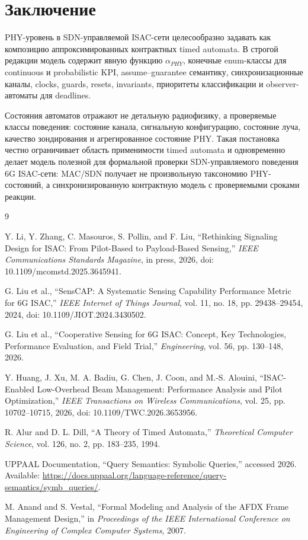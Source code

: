 \documentclass[10pt,a4paper]{article}
\begin{document}
\section{Заключение}

PHY-уровень в SDN-управляемой ISAC-сети целесообразно задавать как композицию аппроксимированных контрактных timed automata. В строгой редакции модель содержит явную функцию \(\alpha_{PHY}\), конечные enum-классы для continuous и probabilistic KPI, assume--guarantee семантику, синхронизационные каналы, clocks, guards, resets, invariants, приоритеты классификации и observer-автоматы для deadlines.

Состояния автоматов отражают не детальную радиофизику, а проверяемые классы поведения: состояние канала, сигнальную конфигурацию, состояние луча, качество зондирования и агрегированное состояние PHY. Такая постановка честно ограничивает область применимости timed automata и одновременно делает модель полезной для формальной проверки SDN-управляемого поведения 6G ISAC-сети: MAC/SDN получает не произвольную таксономию PHY-состояний, а синхронизированную контрактную модель с проверяемыми сроками реакции.

\begin{thebibliography}{9}

Y. Li, Y. Zhang, C. Masouros, S. Pollin, and F. Liu, ``Rethinking Signaling Design for ISAC: From Pilot-Based to Payload-Based Sensing,'' \emph{IEEE Communications Standards Magazine}, in press, 2026, doi: 10.1109/mcomstd.2025.3645941.

G. Liu et al., ``SensCAP: A Systematic Sensing Capability Performance Metric for 6G ISAC,'' \emph{IEEE Internet of Things Journal}, vol. 11, no. 18, pp. 29438--29454, 2024, doi: 10.1109/JIOT.2024.3430502.

G. Liu et al., ``Cooperative Sensing for 6G ISAC: Concept, Key Technologies, Performance Evaluation, and Field Trial,'' \emph{Engineering}, vol. 56, pp. 130--148, 2026.

Y. Huang, J. Xu, M. A. Badiu, G. Chen, J. Coon, and M.-S. Alouini, ``ISAC-Enabled Low-Overhead Beam Management: Performance Analysis and Pilot Optimization,'' \emph{IEEE Transactions on Wireless Communications}, vol. 25, pp. 10702--10715, 2026, doi: 10.1109/TWC.2026.3653956.

R. Alur and D. L. Dill, ``A Theory of Timed Automata,'' \emph{Theoretical Computer Science}, vol. 126, no. 2, pp. 183--235, 1994.

UPPAAL Documentation, ``Query Semantics: Symbolic Queries,'' accessed 2026. Available: \url{https://docs.uppaal.org/language-reference/query-semantics/symb_queries/}.

M. Anand and S. Vestal, ``Formal Modeling and Analysis of the AFDX Frame Management Design,'' in \emph{Proceedings of the IEEE International Conference on Engineering of Complex Computer Systems}, 2007.

\end{thebibliography}
\end{document}
